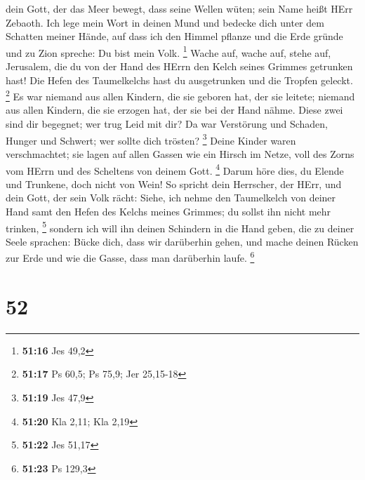 dein Gott, der das Meer bewegt, dass seine Wellen wüten; sein Name heißt
HErr Zebaoth.  Ich lege mein Wort in deinen Mund und
bedecke dich unter dem Schatten meiner Hände, auf dass ich den Himmel
pflanze und die Erde gründe und zu Zion spreche: Du bist mein Volk.
\footnote{\textbf{51:16} Jes 49,2}  Wache auf, wache auf,
stehe auf, Jerusalem, die du von der Hand des HErrn den Kelch seines
Grimmes getrunken hast! Die Hefen des Taumelkelchs hast du ausgetrunken
und die Tropfen geleckt. \footnote{\textbf{51:17} Ps 60,5; Ps 75,9; Jer
  25,15-18}  Es war niemand aus allen Kindern, die sie
geboren hat, der sie leitete; niemand aus allen Kindern, die sie erzogen
hat, der sie bei der Hand nähme.  Diese zwei sind dir
begegnet; wer trug Leid mit dir? Da war Verstörung und Schaden, Hunger
und Schwert; wer sollte dich trösten? \footnote{\textbf{51:19} Jes 47,9}
 Deine Kinder waren verschmachtet; sie lagen auf allen
Gassen wie ein Hirsch im Netze, voll des Zorns vom HErrn und des
Scheltens von deinem Gott. \footnote{\textbf{51:20} Kla 2,11; Kla 2,19}
 Darum höre dies, du Elende und Trunkene, doch nicht von
Wein!  So spricht dein Herrscher, der HErr, und dein Gott,
der sein Volk rächt: Siehe, ich nehme den Taumelkelch von deiner Hand
samt den Hefen des Kelchs meines Grimmes; du sollst ihn nicht mehr
trinken, \footnote{\textbf{51:22} Jes 51,17}  sondern ich
will ihn deinen Schindern in die Hand geben, die zu deiner Seele
sprachen: Bücke dich, dass wir darüberhin gehen, und mache deinen Rücken
zur Erde und wie die Gasse, dass man darüberhin laufe. \footnote{\textbf{51:23}
  Ps 129,3}

\hypertarget{section-18}{%
\section{52}\label{section-18}}

